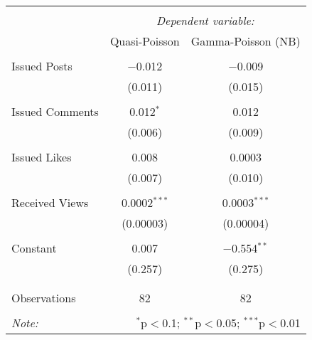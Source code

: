 
\begin{table}[!htbp] \centering 
  \caption{} 
  \label{} 
\begin{tabular}{@{\extracolsep{5pt}}lcc} 
\\[-1.8ex]\hline 
\hline \\[-1.8ex] 
 & \multicolumn{2}{c}{\textit{Dependent variable:}} \\ 
\cline{2-3} 
 & Quasi-Poisson & Gamma-Poisson (NB) \\ 
\hline \\[-1.8ex] 
 Issued Posts & $-$0.012 & $-$0.009 \\ 
  & (0.011) & (0.015) \\ 
  & & \\ 
 Issued Comments & 0.012$^{*}$ & 0.012 \\ 
  & (0.006) & (0.009) \\ 
  & & \\ 
 Issued Likes & 0.008 & 0.0003 \\ 
  & (0.007) & (0.010) \\ 
  & & \\ 
 Received Views  & 0.0002$^{***}$ & 0.0003$^{***}$ \\ 
  & (0.00003) & (0.00004) \\ 
  & & \\ 
 Constant & 0.007 & $-$0.554$^{**}$ \\ 
  & (0.257) & (0.275) \\ 
  & & \\ 
\hline \\[-1.8ex] 
Observations & 82 & 82 \\ 
\hline 
\hline \\[-1.8ex] 
\textit{Note:}  & \multicolumn{2}{r}{$^{*}$p$<$0.1; $^{**}$p$<$0.05; $^{***}$p$<$0.01} \\ 
\end{tabular} 
\end{table} 

